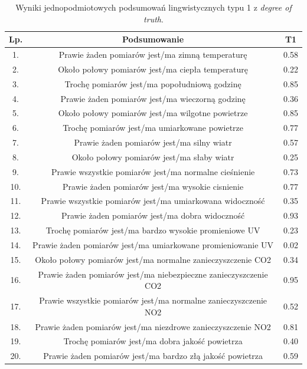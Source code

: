 \documentclass{article}
\begin{document}
\begin{table}[H]
    \centering
    \begin{tabular}{|c|c|c|}
    \hline
    \textbf{Lp.} &\textbf{Podsumowanie} & \textbf{T1}  \\ \hline
    1. & Prawie żaden pomiarów  jest/ma zimną temperaturę & 0.58 \\ \hline
    2. & Około połowy pomiarów  jest/ma ciepła temperaturę & 0.22 \\ \hline
    3. & Trochę pomiarów  jest/ma popołudniową godzinę & 0.85 \\ \hline
    4. & Prawie żaden pomiarów jest/ma wieczorną godzinę & 0.36 \\ \hline
    5. & Około połowy pomiarów jest/ma wilgotne powietrze & 0.85 \\ \hline
    6. & Trochę pomiarów  jest/ma umiarkowane powietrze & 0.77 \\ \hline
    7. & Prawie żaden pomiarów jest/ma silny wiatr & 0.57\\ \hline
    8. & Około połowy pomiarów jest/ma słaby wiatr & 0.25 \\ \hline
    9. & Prawie wszystkie pomiarów jest/ma normalne cieśnienie & 0.73 \\ \hline
    10. & Prawie żaden pomiarów  jest/ma wysokie cisnienie & 0.77 \\ \hline
    11. & Prawie wszystkie pomiarów jest/ma umiarkowana widoczność & 0.35 \\ \hline
    12. & Prawie żaden pomiarów jest/ma dobra widoczność & 0.93 \\ \hline
    13. & Trochę pomiarów  jest/ma bardzo wysokie promieniowe UV & 0.23 \\ \hline
    14. & Prawie żaden pomiarów  jest/ma umiarkowane promieniowanie UV & 0.02 \\ \hline
    15. & Około połowy pomiarów  jest/ma normalne zanieczyszczenie CO2 & 0.34 \\ \hline
    16. & Prawie żaden pomiarów  jest/ma niebezpieczne zanieczyszczenie CO2 & 0.95 \\ \hline 
    17. & Prawie wszystkie pomiarów jest/ma normalne zanieczyszczenie NO2 & 0.52 \\ \hline
    18. & Prawie żaden pomiarów  jest/ma niezdrowe zanieczyszczenie NO2 & 0.81 \\ \hline
    19. & Trochę pomiarów jest/ma dobra jakość powietrza & 0.40 \\ \hline
    20. & Prawie żaden pomiarów  jest/ma bardzo złą jakość powietrza & 0.59 \\ \hline

    \end{tabular}
    \caption{Wyniki jednopodmiotowych podsumowań lingwistycznych typu 1 z \textit{degree of truth}.}
\end{table}
\end{document}
